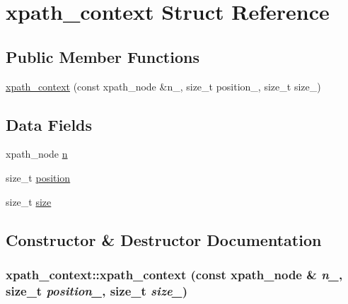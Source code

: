 \hypertarget{structxpath__context}{
\section{xpath\_\-context Struct Reference}
\label{structxpath__context}
}
\subsection*{Public Member Functions}
\begin{CompactItemize}
\item 
\hyperlink{structxpath__context_b5d7a8d5a14ef695b93e15cfb0e20386}{xpath\_\-context} (const xpath\_\-node \&n\_\-, size\_\-t position\_\-, size\_\-t size\_\-)
\end{CompactItemize}
\subsection*{Data Fields}
\begin{CompactItemize}
\item 
xpath\_\-node \hyperlink{structxpath__context_ce8fbb8121820bc5054605c166101273}{n}
\item 
size\_\-t \hyperlink{structxpath__context_dd1fc9bd16b21d3a8d7a4bd63c60af07}{position}
\item 
size\_\-t \hyperlink{structxpath__context_976ffb0eff84a7779c97e589c1785d1c}{size}
\end{CompactItemize}


\subsection{Constructor \& Destructor Documentation}
\hypertarget{structxpath__context_b5d7a8d5a14ef695b93e15cfb0e20386}{
\subsubsection[xpath\_\-context]{\setlength{\rightskip}{0pt plus 5cm}xpath\_\-context::xpath\_\-context (const xpath\_\-node \& {\em n\_\-}, size\_\-t {\em position\_\-}, size\_\-t {\em size\_\-})}}
\label{structxpath__context_b5d7a8d5a14ef695b93e15cfb0e20386}




